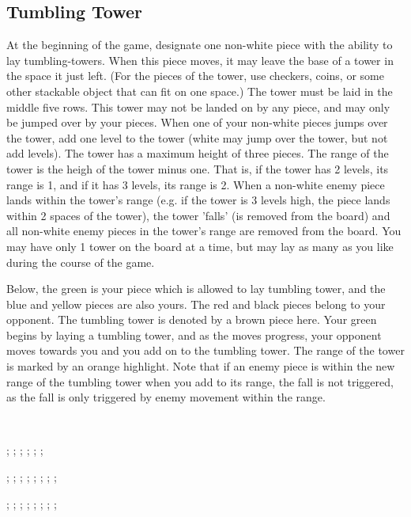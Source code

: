\documentclass[../rulebook.tex]{subfiles}
\begin{document}
\subsection*{Tumbling Tower}

At the beginning of the game,
designate one non-white piece with the ability to lay tumbling-towers.
When this piece moves,
it may leave the base of a tower in the space it just left.
(For the pieces of the tower, use checkers, coins,
or some other stackable object that can fit on one space.)
The tower must be laid in the middle five rows.
This tower may not be landed on by any piece,
and may only be jumped over by your pieces.
When one of your non-white pieces jumps over the tower,
add one level to the tower
(white may jump over the tower, but not add levels).
The tower has a maximum height of three pieces.
The range of the tower is the heigh of the tower minus one.
That is, if the tower has 2 levels, its range is 1,
and if it has 3 levels, its range is 2.
When a non-white enemy piece lands within the tower's range
(e.g. if the tower is 3 levels high, the piece lands within
2 spaces of the tower),
the tower 'falls' (is removed from the board)
and all non-white enemy pieces in the tower's range
are removed from the board. 
You may have only 1 tower on the board at a time,
but may lay as many as you like during the course of the game. 

Below, the green is your piece which is allowed to lay tumbling tower,
and the blue and yellow pieces are also yours.
The red and black pieces belong to your opponent.
The tumbling tower is denoted by a brown piece here.
Your green begins by laying a tumbling tower, and as the moves progress,
your opponent moves towards you and you add on to the tumbling tower.
The range of the tower is marked by an orange highlight.
Note that if an enemy piece is within the new range of the tumbling tower
when you add to its range, the fall is not triggered, as the fall is
only triggered by enemy movement within the range.

\

\begin{center}
  \begin{struggleboard}
    ;
    ;
    ;
    ;
    ;
    ;
  \end{struggleboard}
  \begin{struggleboard}
    ;
    ;
    ;
    ;
    ;
    ;
    ;
    ;
  \end{struggleboard}
  \begin{struggleboard}
    ;
    ;
    ;
    ;
    ;
    ;
    ;
    ;
  \end{struggleboard}
\end{center}
\end{document}
